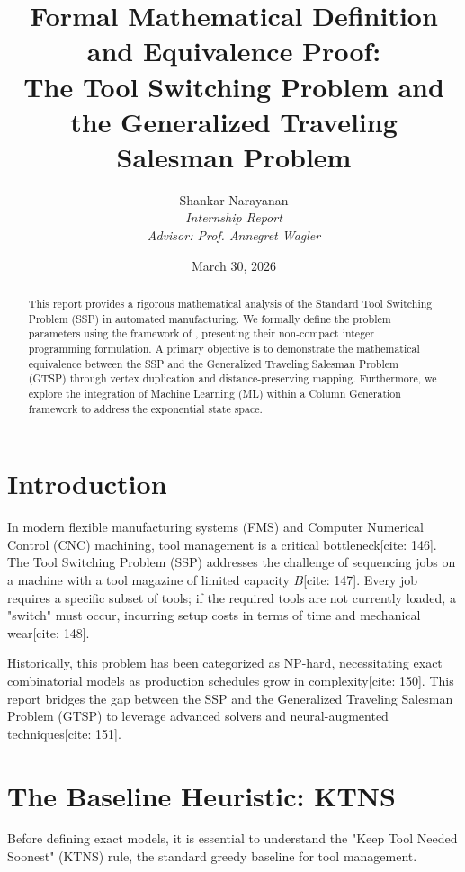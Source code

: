 \documentclass[12pt]{article}
\begin{document}
\title{\textbf{Formal Mathematical Definition and Equivalence Proof: \\ 
The Tool Switching Problem and the Generalized Traveling Salesman Problem}}
\author{Shankar Narayanan \\ \textit{Internship Report} \\ \textit{Advisor: Prof. Annegret Wagler}}
\date{March 30, 2026}

\maketitle

\begin{abstract}
This report provides a rigorous mathematical analysis of the Standard Tool Switching Problem (SSP) in automated manufacturing. We formally define the problem parameters using the framework of \textcite{Colares2026}, presenting their non-compact integer programming formulation. A primary objective is to demonstrate the mathematical equivalence between the SSP and the Generalized Traveling Salesman Problem (GTSP) through vertex duplication and distance-preserving mapping. Furthermore, we explore the integration of Machine Learning (ML) within a Column Generation framework to address the exponential state space.
\end{abstract}

\newpage

\section{Introduction}
In modern flexible manufacturing systems (FMS) and Computer Numerical Control (CNC) machining, tool management is a critical bottleneck[cite: 146]. The Tool Switching Problem (SSP) addresses the challenge of sequencing jobs on a machine with a tool magazine of limited capacity $B$[cite: 147]. Every job requires a specific subset of tools; if the required tools are not currently loaded, a "switch" must occur, incurring setup costs in terms of time and mechanical wear[cite: 148]. 

Historically, this problem has been categorized as NP-hard, necessitating exact combinatorial models as production schedules grow in complexity[cite: 150]. This report bridges the gap between the SSP and the Generalized Traveling Salesman Problem (GTSP) to leverage advanced solvers and neural-augmented techniques[cite: 151].

\section{The Baseline Heuristic: KTNS}
Before defining exact models, it is essential to understand the "Keep Tool Needed Soonest" (KTNS) rule, the standard greedy baseline for tool management. 
\end{document}
